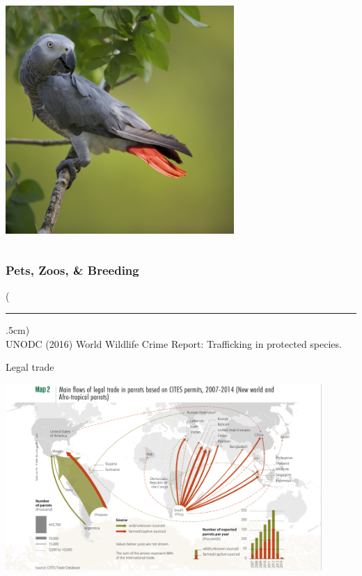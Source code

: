 \documentclass[10pt]{beamer}
\newenvironment{reference}[2]{%
	\begin{textblock*}{\textwidth}(#1,#2)
		\tiny\bgroup\color{gray}}{\egroup\end{textblock*}}
\begin{document}
\begin{frame}[t]
\begin{columns}
		\begin{column}{0.33\textwidth}
			\begin{center}
				\includegraphics[width=0.65\textwidth]{figures/parrot.jpg}
			\end{center}
		\end{column}
	\end{columns}
\end{frame}	


\begin{frame}[t]
\frametitle{Pets, Zoos, \& Breeding}
\vspace{0.5cm}

	\begin{reference}{4mm}{92mm}
		\rule{1.5cm}{0.25pt}\\
		UNODC (2016) World Wildlife Crime Report: Trafficking in protected species.
	\end{reference}
	
	Legal trade
	
	\vspace{0.25cm}
	
		\begin{center}
			\includegraphics[width=0.9\textwidth]{figures/map6b.png}
		\end{center}
\end{frame}	
\end{document}
